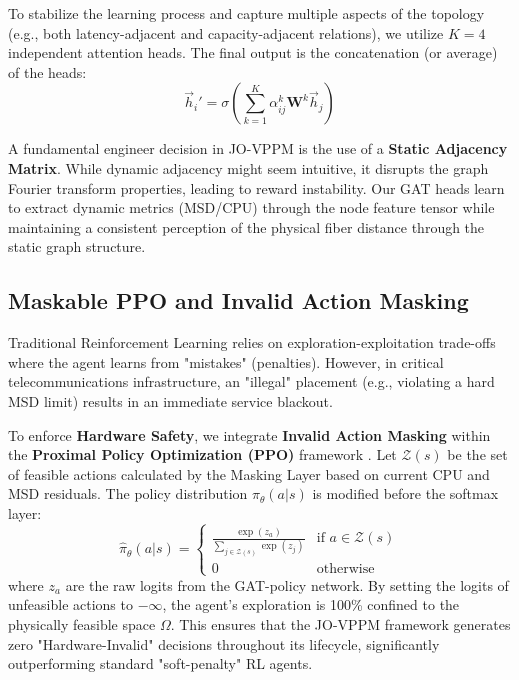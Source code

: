\documentclass[12pt, a4paper, reqno, oneside]{book}
\begin{document}
To stabilize the learning process and capture multiple aspects of the topology (e.g., both latency-adjacent and capacity-adjacent relations), we utilize $K=4$ independent attention heads. The final output is the concatenation (or average) of the heads:
\begin{equation}
\vec{h}_i' = \sigma \left( \sum_{k=1}^K \alpha_{ij}^k \mathbf{W}^k \vec{h}_j \right)
\end{equation}

A fundamental engineer decision in JO-VPPM is the use of a \textbf{Static Adjacency Matrix}. While dynamic adjacency might seem intuitive, it disrupts the graph Fourier transform properties, leading to reward instability. Our GAT heads learn to extract dynamic metrics (MSD/CPU) through the node feature tensor while maintaining a consistent perception of the physical fiber distance through the static graph structure.

\subsection{Maskable PPO and Invalid Action Masking}
Traditional Reinforcement Learning relies on exploration-exploitation trade-offs where the agent learns from "mistakes" (penalties). However, in critical telecommunications infrastructure, an "illegal" placement (e.g., violating a hard MSD limit) results in an immediate service blackout.

To enforce \textbf{Hardware Safety}, we integrate \textbf{Invalid Action Masking} within the \textbf{Proximal Policy Optimization (PPO)} framework \cite{huang2022closer}. Let $\mathcal{Z}(s)$ be the set of feasible actions calculated by the Masking Layer based on current CPU and MSD residuals. The policy distribution $\pi_\theta(a|s)$ is modified before the softmax layer:
\begin{equation}
\hat{\pi}_\theta(a|s) = 
\begin{cases} 
\frac{\exp(z_a)}{\sum_{j \in \mathcal{Z}(s)} \exp(z_j)} & \text{if } a \in \mathcal{Z}(s) \\
0 & \text{otherwise}
\end{cases}
\end{equation}
where $z_a$ are the raw logits from the GAT-policy network. By setting the logits of unfeasible actions to $-\infty$, the agent's exploration is 100\% confined to the physically feasible space $\Omega$. This ensures that the JO-VPPM framework generates zero "Hardware-Invalid" decisions throughout its lifecycle, significantly outperforming standard "soft-penalty" RL agents.
\end{document}
